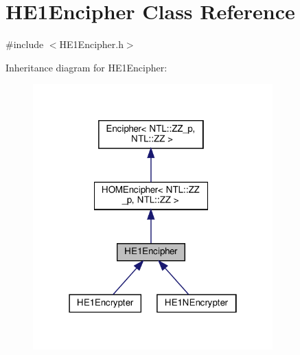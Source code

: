 \hypertarget{classHE1Encipher}{}\section{H\+E1\+Encipher Class Reference}
\label{classHE1Encipher}


{\ttfamily \#include $<$H\+E1\+Encipher.\+h$>$}



Inheritance diagram for H\+E1\+Encipher\+:
\nopagebreak
\begin{figure}[H]
\begin{center}
\leavevmode
\includegraphics[width=262pt]{classHE1Encipher__inherit__graph}
\end{center}
\end{figure}


